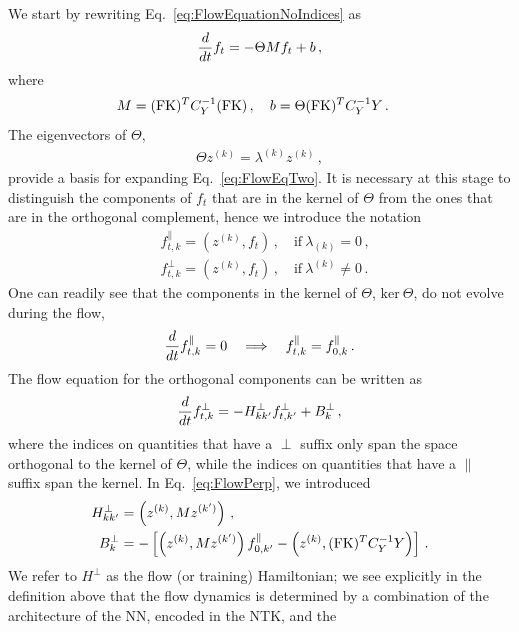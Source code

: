 \documentclass[11pt]{article}
\begin{document}
We start by rewriting Eq.~\eqref{eq:FlowEquationNoIndices} as
\begin{align}
    \label{eq:FlowEqTwo}
    \frac{d}{dt} f_t = -\Theta M f_t + b\, ,
\end{align}
where 
\begin{align}
    M &= (\mathrm{FK})^T C_Y^{-1} (\mathrm{FK})\, , \quad b = \Theta (\mathrm{FK})^T C_Y^{-1} Y\, .
\end{align}
The eigenvectors of $\Theta$, 
\begin{align}
    \label{eq:ThetaEigensystem}
    \Theta z^{(k)} = \lambda^{(k)} z^{(k)}\, ,
\end{align}
provide a basis for expanding Eq.~\eqref{eq:FlowEqTwo}. It is necessary at this stage to distinguish
the components of $f_t$ that are in the kernel of $\Theta$ from the ones that are in the orthogonal 
complement, hence we introduce the notation
\begin{align}
    &f^\parallel_{t,k} = \left(z^{(k)}, f_t\right)\, , \quad \text{if}\ \lambda_{(k)} = 0\, , \\
    &f^\perp_{t,k} = \left(z^{(k)}, f_t\right)\, , \quad \text{if}\ \lambda^{(k)} \neq 0\, .
\end{align}
One can readily see that the components in the kernel of $\Theta$, $\text{ker}\ \Theta$, 
do not evolve during the flow, 
\begin{align}
    \label{eq:FlowParallel}
    \frac{d}{dt} f^\parallel_{t,k} = 0 
        \quad \Longrightarrow \quad f^\parallel_{t,k} = f^\parallel_{0,k}\, .
\end{align}
The flow equation for the orthogonal components can be written as
\begin{align}
    \label{eq:FlowPerp}
    \frac{d}{dt} f^\perp_{t,k} = - H^\perp_{kk'} f^\perp_{t,k'} + B^\perp_{k}\, ,    
\end{align}
where the indices on quantities that have a $\perp$ suffix only span the space orthogonal to the kernel 
of $\Theta$, while the indices on quantities that have a $\parallel$ suffix span the kernel. 
In Eq.~\eqref{eq:FlowPerp}, we introduced
\begin{align}
    H^\perp_{kk'} &= \left(z^{(k)}, M z^{(k')}\right)\, ,\\
    B^\perp_k &= -\left[\left(z^{(k)}, M z^{(k')}\right) f^\parallel_{0,k'} 
        - \left(z^{(k)}, (\mathrm{FK})^T C_Y^{-1} Y\right)\right]\, .
\end{align}
We refer to $H^\perp$ as the flow (or training) Hamiltonian; we see explicitly in the definition above that 
the flow dynamics is determined by a combination of the architecture of the NN, encoded in the NTK, and the 
\end{document}
